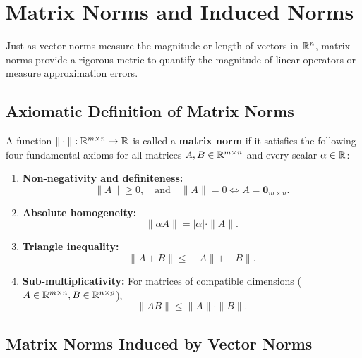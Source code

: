 \FloatBarrier
\section{Matrix Norms and Induced Norms}
\label{sec:matrix-norms-induced-en}

Just as vector norms measure the magnitude or length of vectors in $\mathbb{R}^n$, matrix norms provide a rigorous metric to quantify the magnitude of linear operators or measure approximation errors.

\subsection{Axiomatic Definition of Matrix Norms}

\begin{definition}
A function $\|\cdot\|: \mathbb{R}^{m \times n} \to \mathbb{R}$ is called a \textbf{matrix norm} if it satisfies the following four fundamental axioms for all matrices $A, B \in \mathbb{R}^{m \times n}$ and every scalar $\alpha \in \mathbb{R}$:
\begin{enumerate}
    \item \textbf{Non-negativity and definiteness:}
    \begin{equation}
        \|A\| \ge 0, \quad \text{and} \quad \|A\| = 0 \iff A = \mathbf{0}_{m \times n}.
    \end{equation}
    \item \textbf{Absolute homogeneity:}
    \begin{equation}
        \|\alpha A\| = |\alpha| \cdot \|A\|.
    \end{equation}
    \item \textbf{Triangle inequality:}
    \begin{equation}
        \|A + B\| \le \|A\| + \|B\|.
    \end{equation}
    \item \textbf{Sub-multiplicativity:} For matrices of compatible dimensions ($A \in \mathbb{R}^{m \times n}, B \in \mathbb{R}^{n \times p}$),
    \begin{equation}
        \|AB\| \le \|A\| \cdot \|B\|.
    \end{equation}
\end{enumerate}
\end{definition}

\subsection{Matrix Norms Induced by Vector Norms}

